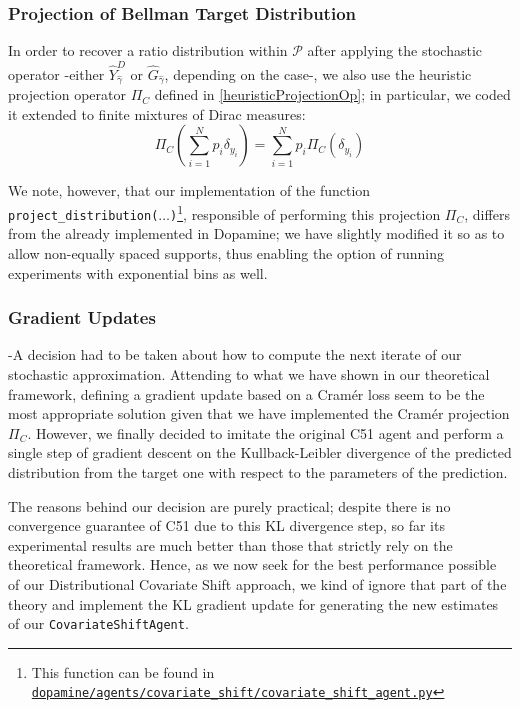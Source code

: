 \documentclass[12pt,a4paper,openright,twoside]{article}
\numberwithin{equation}{section}
\theoremstyle{definition}
\theoremstyle{remark}
\theoremstyle{plain}
\begin{document}
\subsubsection*{Projection of Bellman Target Distribution}
In order to recover a ratio distribution within $\mathcal{P}$ after applying the stochastic operator -either $\hat{Y}^D_{\hat{\gamma}}$ or $\hat{G}_{\hat{\gamma}}$, depending on the case-, we also use the heuristic projection operator $\Pi_C$ defined in \ref{heuristicProjectionOp}; in particular, we coded it extended to finite mixtures of Dirac measures: 
	$$ \Pi_C \left( \sum_{i=1}^{N} p_i \delta_{y_i} \right) = \sum_{i=1}^{N} p_i \Pi_C ( \delta_{y_i} )	$$


We note, however, that our implementation of the function \texttt{project\_distribution($\dots$)}\footnote{This function can be found in \href{https://github.com/gbg141/dopamine/blob/master/dopamine/agents/covariate_shift/covariate_shift_agent.py}{\texttt{dopamine/agents/covariate\_shift/covariate\_shift\_agent.py}}}, responsible of performing this projection $\Pi_C$, differs from the already implemented in Dopamine; we have slightly modified it so as to allow non-equally spaced supports, thus enabling the option of running experiments with exponential bins as well.


\subsubsection*{Gradient Updates}
-A decision had to be taken about how to compute the next iterate of our stochastic approximation. Attending to what we have shown in our theoretical framework, defining a gradient update based on a Cramér loss seem to be the most appropriate solution given that we have implemented the Cramér projection $\Pi_C$. However, we finally decided to imitate the original C51 agent and perform a single step of gradient descent on the Kullback-Leibler divergence of the predicted distribution from the target one with respect to the parameters of the prediction.

The reasons behind our decision are purely practical; despite there is no convergence guarantee of C51 due to this KL divergence step, so far its experimental results\cite{DRL} are much better than those that strictly rely on the theoretical framework\cite{DRLlinear}. Hence, as we now seek for the best performance possible of our Distributional Covariate Shift approach, we kind of ignore that part of the theory and implement the KL gradient update for generating the new estimates of our \texttt{CovariateShiftAgent}.
 
\end{document}
